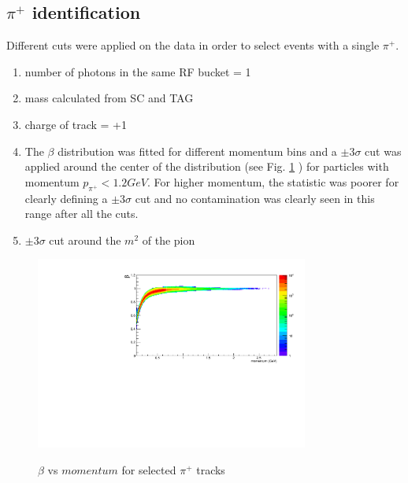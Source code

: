 \subsection{$\pi^+$ identification}
Different cuts were applied on the data in order to select events with a single $\pi^+$.
\begin{enumerate}
  \item number of photons in the same RF bucket = 1
  \item mass calculated from SC and TAG
  \item charge of track = +1
  \item The $\beta$ distribution was fitted for different momentum bins and a $\pm 3 \sigma$ cut was applied around the center of the distribution (see Fig. \ref{fig:beta_mom_pip} ) for particles with momentum $p_{\pi^+} < 1.2GeV$. For higher momentum, the statistic was poorer for clearly defining a $\pm 3 \sigma$ cut and no contamination was clearly seen in this range after all the cuts.
  \item  $\pm 3 \sigma$ cut around the $m^2$ of the pion
\end{enumerate}
\begin{figure}[htb]
  \includegraphics[width=0.8\textwidth]{figures/pid_beta_mom_pip.pdf} \\
  \caption{$\beta$ vs $momentum$ for selected $\pi^+$ tracks}
  \label{fig:beta_mom_pip}
\end{figure}

